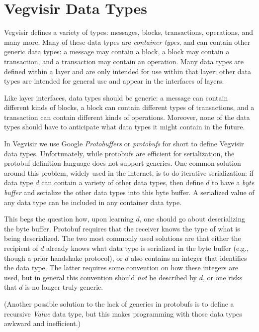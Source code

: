 \documentclass{article}
\begin{document}
\section{Vegvisir Data Types}

Vegvisir defines a variety of types: messages, blocks, transactions,
operations, and many more.  Many of these data types are \emph{container
types}, and can contain other generic data types: a message may contain
a block, a block may contain a transaction, and a transaction may contain
an operation.
Many data types are defined
within a layer and are only intended for use within that layer; other
data types are intended for general use and appear in the interfaces
of layers.

Like layer interfaces, data types should be generic: a message can
contain different kinds of blocks, a block can contain different types
of transactions, and a transaction can contain different kinds of
operations.  Moreover, none of the data types should have to anticipate
what data types it might contain in the future.

In Vegvisir we use Google \emph{Protobuffers} or \emph{protobufs}
for short to define Vegvisir data types.
Unfortunately, while protobufs are efficient for serialization,
the protobuf definition language does not support generics.
One common solution around this problem, widely used in the internet,
is to do iterative serialization:
if data type $d$ can contain a variety of other data types, then
define $d$ to have a \emph{byte buffer} and serialize the other data
types into this byte buffer.
A serialized value of any data type can be included in any container data type.

This begs the question how, upon learning $d$, one should go about
deserializing the byte buffer.
Protobuf requires that the receiver knows the type of what is being
deserialized.
The two most commonly used solutions are that
either the recipient of $d$ already knows what data type is serialized in
the byte buffer (e.g., though a prior handshake protocol), or $d$
also contains an integer that identifies the data type.
The latter requires some convention on how these integers are used,
but in general this convention should \emph{not} be described by $d$,
or one risks that $d$ is no longer truly generic.

(Another possible solution to the lack of generics in protobufs is to
define a recursive \emph{Value} data type, but this makes programming
with those data types awkward and inefficient.)
\end{document}

